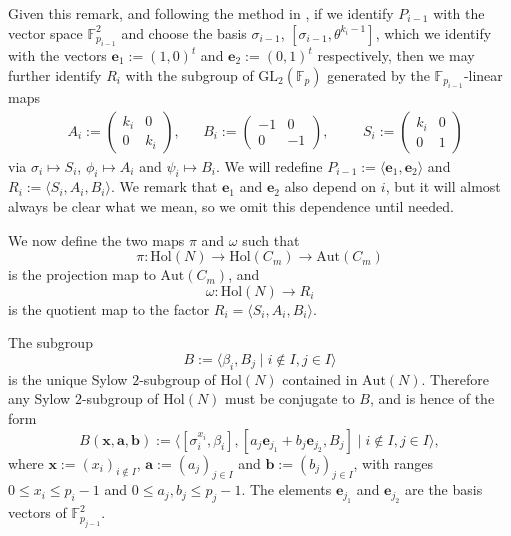 \documentclass[a4paper,reqno]{amsart}
\theoremstyle{definition}
\newcommand{\e}{\textbf{e}}
\newcommand{\Aut}{\mathrm{Aut}}
\newcommand{\Hol}{\mathrm{Hol}}
\begin{document}
Given this remark, and following the method in \cite{BML21}, if we identify $P_{i-1}$ with the vector space $\mathbb{F}_{p_{i-1}}^2$ and choose the basis $\sigma_{i-1}$, $[\sigma_{i-1},\theta^{k_i-1}]$, which we identify with the vectors $\e_1:=(1,0)^t$ and $\e_2:=(0,1)^t$ respectively, then we may further identify $R_i$ with the subgroup of $\mathrm{GL}_2(\mathbb{F}_p)$ generated by the $\mathbb{F}_{p_{i-1}}$-linear maps
\begin{align*}&A_i:=\begin{pmatrix}
		k_i & 0	\\
		0 	& k_i
	\end{pmatrix},
	&&B_i:=\begin{pmatrix}
		-1	& 0	\\
		0	& -1
	\end{pmatrix},
	&&&S_i:=\begin{pmatrix}
		k_i & 0 \\
		0	& 1
	\end{pmatrix}
\end{align*}
via $\sigma_i \mapsto S_i$, $\phi_i \mapsto A_i$ and $\psi_i \mapsto B_i$. We will redefine $P_{i-1}:=\langle \e_1,\e_2 \rangle$ and $R_i:=\langle S_i,A_i,B_i \rangle$. We remark that $\e_1$ and $\e_2$ also depend on $i$, but it will almost always be clear what we mean, so we omit this dependence until needed.

We now define the two maps $\pi$ and $\omega$ such that
\[\pi: \Hol(N) \to \Hol(C_m) \to \Aut(C_m)\]
is the projection map to $\Aut(C_m)$, and
\[\omega: \Hol(N) \to R_i\]
is the quotient map to the factor $R_i= \langle S_i,A_i,B_i \rangle$.

The subgroup
\begin{equation}\label{B}
    B:=\langle \beta_i,B_j \mid i \notin I, j \in I \rangle
\end{equation}
is the unique Sylow $2$-subgroup of $\Hol(N)$ contained in $\Aut(N)$. Therefore any Sylow $2$-subgroup of $\Hol(N)$ must be conjugate to $B$, and is hence of the form
\[B(\mathbf{x},\mathbf{a},\mathbf{b}):=\langle [\sigma_i^{x_i},\beta_i],[a_j\e_{j_1}+b_j\e_{j_2},B_j] \mid i \notin I, j \in I \rangle,\]
where $\mathbf{x}:=(x_i)_{i \notin I}$, $\mathbf{a}:=(a_j)_{j \in I}$ and $\mathbf{b}:=(b_j)_{j \in I}$, with ranges $0 \leq x_i \leq p_i-1$ and $0 \leq a_j,b_j \leq p_j-1$. The elements $\e_{j_1}$ and $\e_{j_2}$ are the basis vectors of $\mathbb{F}^2_{p_{j-1}}$.
\end{document}
